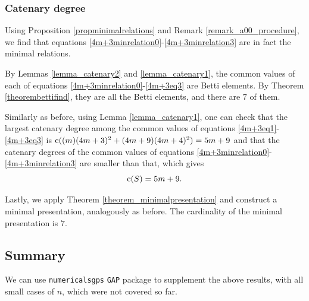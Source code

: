 \documentclass[12pt]{article}
\theoremstyle{remark}
\begin{document}
\subsubsection{Catenary degree}
Using Proposition \ref{propminimalrelations} and Remark \ref{remark_a00_procedure}, we find that equations \eqref{4m+3minrelation0}-\eqref{4m+3minrelation3} are in fact the minimal relations.

By Lemmas \ref{lemma_catenary2} and \ref{lemma_catenary1}, the common values of each of equations \eqref{4m+3minrelation0}-\eqref{4m+3eq3} are Betti elements. 
By Theorem \ref{theorembettifind}, they are all the Betti elements, and there are $7$ of them.

Similarly as before, using Lemma \ref{lemma_catenary1}, one can check that the largest catenary degree among the common values of equations \eqref{4m+3eq1}-\eqref{4m+3eq3} is $\textup{c}((m)(4m+3)^2 + (4m+9)(4m+4)^2) = 5m+9$ and that the catenary degrees of the common values of equations \eqref{4m+3minrelation0}-\eqref{4m+3minrelation3} are smaller than that, which gives
$$ \textup{c}(S) = 5m+9.$$

Lastly, we apply Theorem \ref{theorem_minimalpresentation} and construct a minimal presentation, analogously as before. The cardinality of the minimal presentation is $7$.

\subsection{Summary}

We can use \texttt{numericalsgps} \cite{NumericalSgps} \texttt{GAP} \cite{GAP4} package to supplement the above results, with all small cases of $n$, which were not covered so far.  
\end{document}
